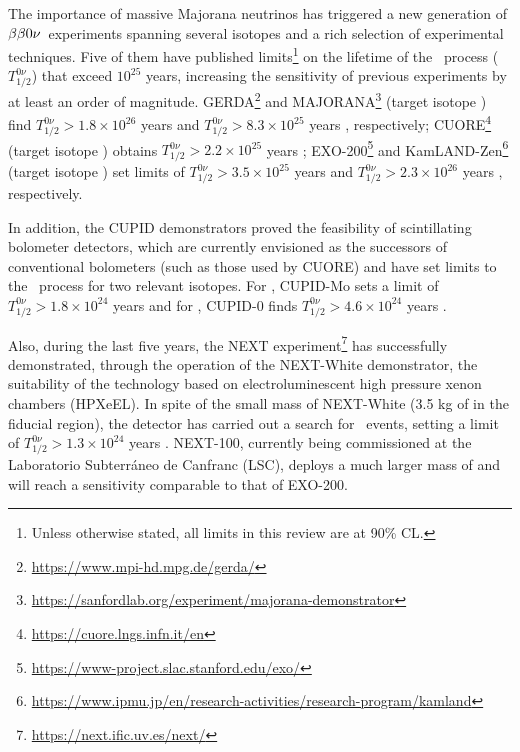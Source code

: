 The importance of massive Majorana neutrinos has triggered a new generation of $\beta\beta0\nu$~experiments spanning several isotopes and a rich selection of experimental techniques. Five of them have published limits\footnote{Unless otherwise stated, all limits in this review are at 90\% CL.} on the lifetime of the \bbonu\ process ($T^{0\nu}_{1/2}$) that exceed $10^{25}$ years, increasing the sensitivity of previous  experiments by at least an order of magnitude. GERDA\footnote{\url{https://www.mpi-hd.mpg.de/gerda/}} and MAJORANA\footnote{\url{https://sanfordlab.org/experiment/majorana-demonstrator}} (target isotope ) find \mbox{$T^{0\nu}_{1/2} > 1.8 \times 10^{26}$} years \cite{GERDA:2020xhi} and \mbox{$T^{0\nu}_{1/2} > 8.3 \times 10^{25}$} years \cite{Majorana:2022udl}, respectively; CUORE\footnote{\url{https://cuore.lngs.infn.it/en}} (target isotope ) obtains \mbox{$T^{0\nu}_{1/2} > 2.2 \times 10^{25}$} years \cite{CUORE:2021mvw}; EXO-200\footnote{\url{https://www-project.slac.stanford.edu/exo/}} and KamLAND-Zen\footnote{\url{https://www.ipmu.jp/en/research-activities/research-program/kamland}} (target isotope ) set limits of \mbox{$T^{0\nu}_{1/2} > 3.5 \times 10^{25}$} years \cite{EXO-200:2019rkq} and \mbox{$T^{0\nu}_{1/2} > 2.3 \times 10^{26}$} years \cite{KamLAND-Zen:2022tow}, respectively. 
 
In addition, the CUPID demonstrators proved the feasibility of scintillating bolometer detectors, which are currently envisioned as the successors of conventional bolometers (such as those used by CUORE) and have set limits to the \bbonu\ process for two relevant isotopes. For , CUPID-Mo sets a limit of \mbox{$T^{0\nu}_{1/2} > 1.8 \times 10^{24}$} years \cite{Augier:2022znx} and for , CUPID-0 finds \mbox{$T^{0\nu}_{1/2} > 4.6 \times 10^{24}$} years \cite{CUPID:2022puj}. 

Also, during the last five years, the NEXT experiment\footnote{\url{https://next.ific.uv.es/next/}} has successfully demonstrated, through the operation of the NEXT-White demonstrator, the suitability of the technology based on electroluminescent high pressure xenon chambers (HPXeEL). In spite of the small mass of NEXT-White (3.5 kg of  in the fiducial region), the detector has carried out a search for \bbonu\ events, setting a limit of \mbox{$T^{0\nu}_{1/2} > 1.3 \times 10^{24}$} years  \cite{NEXT:2023daz}. NEXT-100, currently being commissioned at the Laboratorio Subterr\'aneo de Canfranc (LSC), deploys a much larger mass of  and will reach a sensitivity comparable to that of EXO-200.

